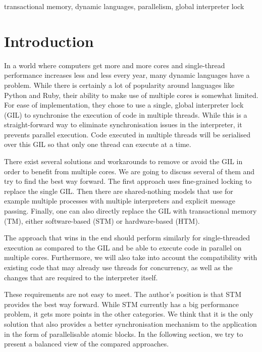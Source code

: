 \documentclass{sigplanconf}
\begin{document}


\keywords
transactional memory, dynamic languages, parallelism, global interpreter lock

\section{Introduction}
In a world where computers get more and more cores and single-thread
performance increases less and less every year, many dynamic languages
have a problem. While there is certainly a lot of popularity around
languages like Python and Ruby, their ability to make use of multiple
cores is somewhat limited. For ease of implementation, they chose to
use a single, global interpreter lock (GIL) to synchronise the
execution of code in multiple threads. While this is a
straight-forward way to eliminate synchronisation issues in the
interpreter, it prevents parallel execution. Code executed in multiple
threads will be serialised over this GIL so that only one thread can
execute at a time.

There exist several solutions and workarounds to remove or avoid the
GIL in order to benefit from multiple cores. We are going to discuss
several of them and try to find the best way forward. The first
approach uses fine-grained locking to replace the single GIL. Then
there are shared-nothing models that use for example multiple
processes with multiple interpreters and explicit message
passing. Finally, one can also directly replace the GIL with
transactional memory (TM), either software-based (STM) or
hardware-based (HTM).

The approach that wins in the end should perform similarly for
single-threaded execution as compared to the GIL and be able to
execute code in parallel on multiple cores. Furthermore, we will also
take into account the compatibility with existing code that may already use
threads for concurrency, as well as the changes that are required to
the interpreter itself.

These requirements are not easy to meet. The author's position is that
STM provides the best way forward. While STM currently has a big
performance problem, it gets more points in the other categories. We
think that it is the only solution that also provides a better
synchronisation mechanism to the application in the form of
parallelisable atomic blocks.  In the following section, we try to
present a balanced view of the compared approaches.
\end{document}
